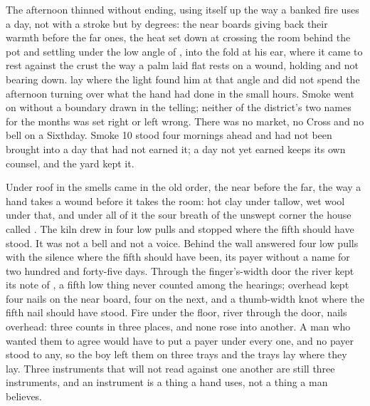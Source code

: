 The afternoon thinned without ending, using itself up the way a banked fire uses a day, not with a stroke but by degrees: the near boards giving back their warmth before the far ones, the heat set down at  crossing the room behind the pot and settling under the low angle of , into the fold at his ear, where it came to rest against the crust the way a palm laid flat rests on a wound, holding and not bearing down.  lay where the light found him at that angle and did not spend the afternoon turning over what the hand had done in the small hours. Smoke went on without a boundary drawn in the telling; neither of the district's two names for the months was set right or left wrong. There was no market, no Cross and no bell on a Sixthday. Smoke 10 stood four mornings ahead and had not been brought into a day that had not earned it; a day not yet earned keeps its own counsel, and the yard kept it.

Under  roof in  the smells came in the old order, the near before the far, the way a hand takes a wound before it takes the room: hot clay under tallow, wet wool under that, and under all of it the sour  breath of the unswept corner the house called . The kiln drew in four low pulls and stopped where the fifth should have stood. It was not a bell and not a voice. Behind the wall  answered four low pulls with the silence where the fifth should have been, its payer without a name for two hundred and forty-five days. Through the finger's-width door the river kept its note of , a fifth low thing never counted among the hearings; overhead  kept four nails on the near board, four on the next, and a thumb-width knot where the fifth nail should have stood. Fire under the floor, river through the door, nails overhead: three counts in three places, and none rose into another. A man who wanted them to agree would have to put a payer under every one, and no payer stood to any, so the boy left them on three trays and the trays lay where they lay. Three instruments that will not read against one another are still three instruments, and an instrument is a thing a hand uses, not a thing a man believes.

